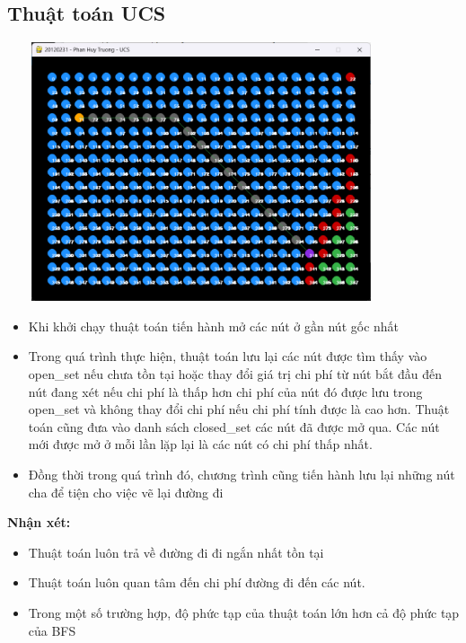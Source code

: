 \documentclass{article}
\begin{document}
\subsection{Thuật toán UCS}
    \centerline{\includegraphics[width=4.5in, height=3in]{image/ucs_stimulation.png}}
    \vspace{2\baselineskip}
    \begin{itemize}
        \item Khi khởi chạy thuật toán tiến hành mở các nút ở gần nút gốc nhất
        \item Trong quá trình thực hiện, thuật toán lưu lại các nút được tìm thấy vào open\_set nếu chưa tồn tại hoặc thay đổi giá trị chi phí từ nút bắt đầu đến nút đang xét nếu chi phí là thấp hơn chi phí của nút đó được lưu trong open\_set và không thay đổi chi phí nếu chi phí tính được là cao hơn. Thuật toán cũng đưa vào danh sách closed\_set các nút đã được mở qua. Các nút mới được mở ở mỗi lần lặp lại là các nút có chi phí thấp nhất.
        \item Đồng thời trong quá trình đó, chương trình cũng tiến hành lưu lại những nút cha để tiện cho việc vẽ lại đường đi
    \end{itemize}
    \textbf{Nhận xét: }
    \begin{itemize}
        \item Thuật toán luôn trả về đường đi đi ngắn nhất tồn tại
        \item Thuật toán luôn quan tâm đến chi phí đường đi đến các nút. 
        \item Trong một số trường hợp, độ phức tạp của thuật toán lớn hơn cả độ phức tạp của BFS
    \end{itemize}
\end{document}
